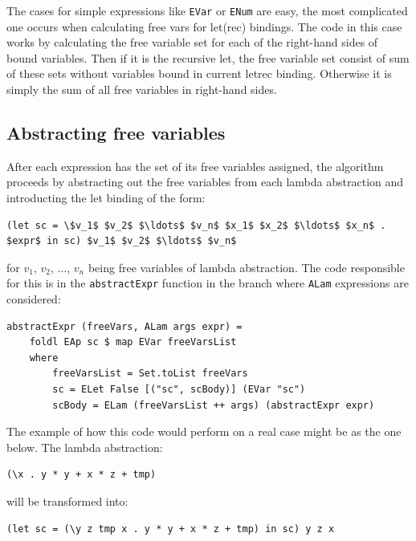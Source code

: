 \documentclass[12pt,a4paper]{report}
\begin{document}
The cases for simple expressions like \texttt{EVar} or \texttt{ENum} are easy,
the most complicated one occurs when calculating free vars for
let(rec) bindings. The code in this case works by calculating the free
variable set for each of the right-hand sides of bound variables. Then if it is
the recursive let, the free variable set consist of sum of these sets without
variables bound in current letrec binding. Otherwise it is simply the
sum of all free variables in right-hand sides.

\subsection{Abstracting free variables}
After each expression has the set of its free variables assigned, the algorithm
proceeds by abstracting out the free variables from each lambda abstraction and
introducting the let binding of the form:

\vspace*{0.2in}
\begin{lstlisting}[style=haskell,mathescape=true]
(let sc = \$v_1$ $v_2$ $\ldots$ $v_n$ $x_1$ $x_2$ $\ldots$ $x_n$ . $expr$ in sc) $v_1$ $v_2$ $\ldots$ $v_n$
\end{lstlisting}

for $v_1$, $v_2$, $\ldots$, $v_n$ being free variables of lambda abstraction.
The code responsible for this is in the \texttt{abstractExpr} function in the
branch where \texttt{ALam} expressions are considered:

\vspace*{0.2in}
\begin{lstlisting}[style=haskell]
abstractExpr (freeVars, ALam args expr) =
    foldl EAp sc $ map EVar freeVarsList
    where
        freeVarsList = Set.toList freeVars
        sc = ELet False [("sc", scBody)] (EVar "sc")
        scBody = ELam (freeVarsList ++ args) (abstractExpr expr)
\end{lstlisting}

The example of how this code would perform on a real case might be as the one
below. The lambda abstraction:

\vspace*{0.2in}
\begin{lstlisting}[style=haskell]
(\x . y * y + x * z + tmp)
\end{lstlisting}

will be transformed into:

\vspace*{0.2in}
\begin{lstlisting}[style=haskell]
(let sc = (\y z tmp x . y * y + x * z + tmp) in sc) y z x
\end{lstlisting}
\end{document}
